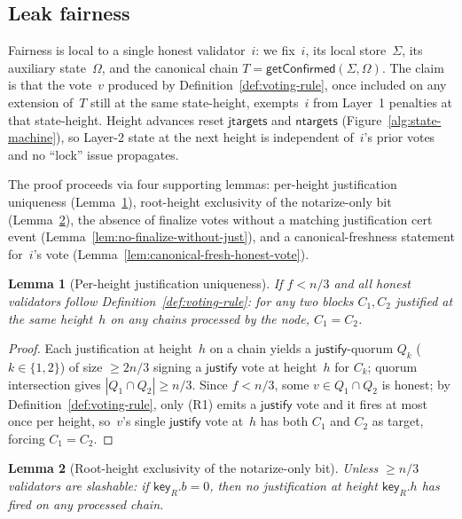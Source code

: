 \documentclass{article}
\newcommand{\just}{\ensuremath{\mathsf{justify}}\xspace}
\newcommand{\jtargets}{\mathsf{jtargets}}
\newcommand{\ntargets}{\mathsf{ntargets}}
\newcommand{\key}{\mathsf{key}}
\newcommand{\getConfirmed}{\textsf{getConfirmed}\xspace}
\theoremstyle{plain}
\newtheorem{lemma}{Lemma}
\theoremstyle{definition}
\theoremstyle{remark}
\begin{document}
\subsection{Leak fairness}

Fairness is local to a single honest validator~$i$: we fix~$i$, its local store~$\Sigma$, its auxiliary state~$\Omega$, and the canonical chain $T = \getConfirmed(\Sigma, \Omega)$.
The claim is that the vote~$v$ produced by Definition~\ref{def:voting-rule}, once included on any extension of~$T$ still at the same state-height, exempts~$i$ from Layer~1 penalties at that state-height.
Height advances reset $\jtargets$ and $\ntargets$ (Figure~\ref{alg:state-machine}), so Layer-2 state at the next height is independent of~$i$'s prior votes and no ``lock'' issue propagates.

The proof proceeds via four supporting lemmas: per-height justification uniqueness (Lemma~\ref{lem:just-unique-height}), root-height exclusivity of the notarize-only bit (Lemma~\ref{lem:root-h-notarize-only}), the absence of finalize votes without a matching justification cert event (Lemma~\ref{lem:no-finalize-without-just}), and a canonical-freshness statement for~$i$'s vote (Lemma~\ref{lem:canonical-fresh-honest-vote}).

\begin{lemma}[Per-height justification uniqueness]\label{lem:just-unique-height}
If $f < n/3$ and all honest validators follow Definition~\ref{def:voting-rule}: for any two blocks $C_1, C_2$ justified at the same height~$h$ on any chains processed by the node, $C_1 = C_2$.
\end{lemma}

\begin{proof}
Each justification at height~$h$ on a chain yields a \just-quorum $Q_k$ ($k \in \{1, 2\}$) of size $\geq 2n/3$ signing a \just vote at height~$h$ for $C_k$; quorum intersection gives $|Q_1 \cap Q_2| \geq n/3$.
Since $f < n/3$, some $v \in Q_1 \cap Q_2$ is honest; by Definition~\ref{def:voting-rule}, only (R1) emits a \just vote and it fires at most once per height, so~$v$'s single \just vote at~$h$ has both $C_1$ and $C_2$ as target, forcing $C_1 = C_2$.
\end{proof}

\begin{lemma}[Root-height exclusivity of the notarize-only bit]\label{lem:root-h-notarize-only}
Unless $\geq n/3$ validators are slashable: if $\key_R.b = 0$, then no justification at height $\key_R.h$ has fired on any processed chain.
\end{lemma}
\end{document}
